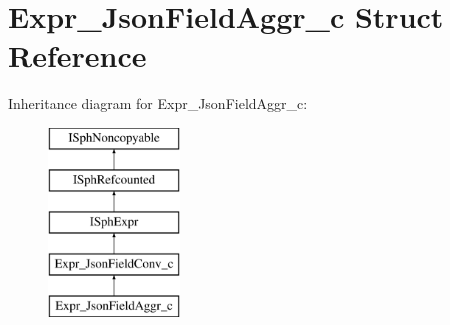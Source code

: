 \hypertarget{structExpr__JsonFieldAggr__c}{\section{Expr\-\_\-\-Json\-Field\-Aggr\-\_\-c Struct Reference}
\label{structExpr__JsonFieldAggr__c}
}
Inheritance diagram for Expr\-\_\-\-Json\-Field\-Aggr\-\_\-c\-:\begin{figure}[H]
\begin{center}
\leavevmode
\includegraphics[height=5.000000cm]{structExpr__JsonFieldAggr__c}
\end{center}
\end{figure}
